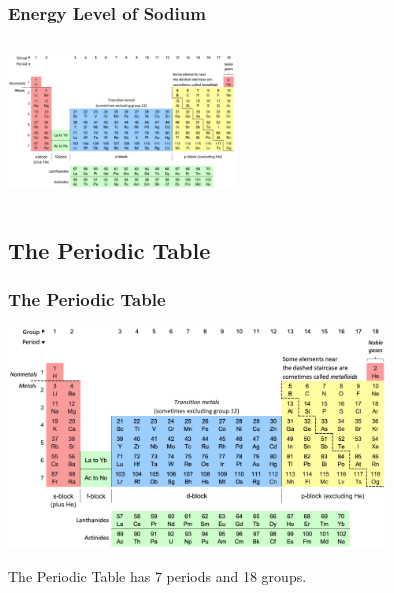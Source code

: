 \documentclass{beamer}
\begin{document}
\begin{frame}
    \frametitle{Energy Level of Sodium}
    \begin{columns}
        
        \begin{column}{0.5\textwidth}
            \includegraphics[width=6cm]{../../../../public/images/pTable.png}
            
        \end{column}
        \begin{column}{0.5\textwidth}
            
        \end{column}
    \end{columns}

\end{frame}


\subsection{The Periodic Table}


\begin{frame}
    \frametitle{The Periodic Table}
    \includegraphics[width=10cm]{../../../../public/images/pTable.png}

\onslide The Periodic Table has
\pause \alert{7}
\onslide periods and 
\pause \alert{18} 
\onslide groups.


\end{frame}
\end{document}
